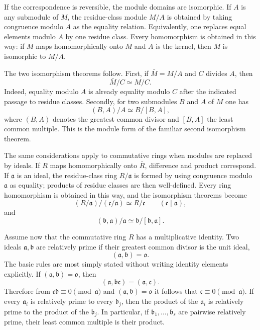 \documentclass[11pt]{article}
\begin{document}
If the correspondence is reversible, the module domains are isomorphic. If $A$ is any submodule of $M$, the residue-class module $M/A$ is obtained by taking congruence modulo $A$ as the equality relation. Equivalently, one replaces equal elements modulo $A$ by one residue class. Every homomorphism is obtained in this way: if $M$ maps homomorphically onto $\bar M$ and $A$ is the kernel, then $\bar M$ is isomorphic to $M/A$.

The two isomorphism theorems follow. First, if $\bar M=M/A$ and $C$ divides $A$, then
\[
  \bar M/C \simeq M/C.
\]
Indeed, equality modulo $A$ is already equality modulo $C$ after the indicated passage to residue classes. Secondly, for two submodules $B$ and $A$ of $M$ one has
\[
  (B,A)/A \simeq B/[B,A],
\]
where $(B,A)$ denotes the greatest common divisor and $[B,A]$ the least common multiple. This is the module form of the familiar second isomorphism theorem.

The same considerations apply to commutative rings when modules are replaced by ideals. If $R$ maps homomorphically onto $\bar R$, difference and product correspond. If $\mathfrak a$ is an ideal, the residue-class ring $R/\mathfrak a$ is formed by using congruence modulo $\mathfrak a$ as equality; products of residue classes are then well-defined. Every ring homomorphism is obtained in this way, and the isomorphism theorems become
\[
  (R/\mathfrak a)/(\mathfrak c/\mathfrak a)\simeq R/\mathfrak c
  \qquad (\mathfrak c\mid \mathfrak a),
\]
and
\[
  (\mathfrak b,\mathfrak a)/\mathfrak a\simeq \mathfrak b/[\mathfrak b,\mathfrak a].
\]

Assume now that the commutative ring $R$ has a multiplicative identity. Two ideals $\mathfrak a,\mathfrak b$ are relatively prime if their greatest common divisor is the unit ideal,
\[
  (\mathfrak a,\mathfrak b)=\mathfrak o.
\]
The basic rules are most simply stated without writing identity elements explicitly. If $(\mathfrak a,\mathfrak b)=\mathfrak o$, then
\[
  (\mathfrak a,\mathfrak b\mathfrak c)=(\mathfrak a,\mathfrak c).
\]
Therefore from $\mathfrak c\mathfrak b\equiv0\pmod{\mathfrak a}$ and $(\mathfrak a,\mathfrak b)=\mathfrak o$ it follows that $\mathfrak c\equiv0\pmod{\mathfrak a}$. If every $\mathfrak a_i$ is relatively prime to every $\mathfrak b_j$, then the product of the $\mathfrak a_i$ is relatively prime to the product of the $\mathfrak b_j$. In particular, if $\mathfrak b_1,\ldots,\mathfrak b_s$ are pairwise relatively prime, their least common multiple is their product.
\end{document}
